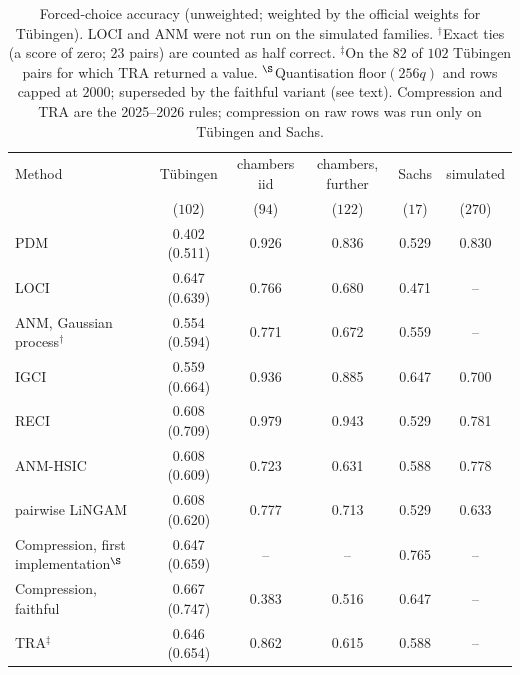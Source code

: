 \begin{table}[t]
\caption{Forced-choice accuracy (unweighted; weighted by the official weights for Tübingen).
LOCI and ANM were not run on the simulated families. $^{\dagger}$Exact ties (a score of zero; $23$
pairs) are counted as half correct. $^{\ddagger}$On the $82$ of $102$ Tübingen pairs for which TRA returned a value. $^{\S}$Quantisation floor$(256q)$ and rows capped at $2000$; superseded by the faithful variant (see text). Compression and TRA are the 2025--2026 rules; compression on raw rows was run only on Tübingen and Sachs.}
\label{tab:pairs}
\small
\setlength{\tabcolsep}{2.5pt}
\begin{tabular}{@{}lccccc@{}}
\toprule
Method & Tübingen & chambers iid & chambers, further & Sachs & simulated\\
 & ($102$) & ($94$) & ($122$) & ($17$) & ($270$)\\
\midrule
PDM & 0.402 (0.511) & 0.926 & 0.836 & 0.529 & 0.830\\
LOCI & 0.647 (0.639) & 0.766 & 0.680 & 0.471 & --\\
ANM, Gaussian process$^{\dagger}$ & 0.554 (0.594) & 0.771 & 0.672 & 0.559 & --\\
IGCI & 0.559 (0.664) & 0.936 & 0.885 & 0.647 & 0.700\\
RECI & 0.608 (0.709) & 0.979 & 0.943 & 0.529 & 0.781\\
ANM-HSIC & 0.608 (0.609) & 0.723 & 0.631 & 0.588 & 0.778\\
pairwise LiNGAM & 0.608 (0.620) & 0.777 & 0.713 & 0.529 & 0.633\\
\midrule
Compression, first implementation$^{\S}$ & 0.647 (0.659) & -- & -- & 0.765 & --\\
Compression, faithful & 0.667 (0.747) & 0.383 & 0.516 & 0.647 & --\\
TRA$^{\ddagger}$ & 0.646 (0.654) & 0.862 & 0.615 & 0.588 & --\\
\bottomrule
\end{tabular}
\end{table}


